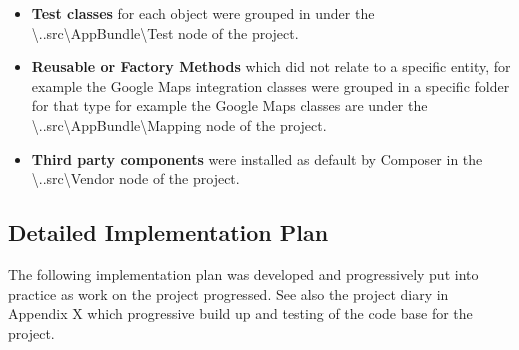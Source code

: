 \documentclass[a4paper,Times New Roman 11pt]{article}
\begin{document}
\begin {itemize}
\textbackslash ..src\textbackslash AppBundle\textbackslash Repository node of the project. Within this folder a separate controller file was created with a standard naming convention used e.g. EmployeeRepository, RosterRepository. 

\item \textbf{Test classes} for each object were grouped in under the 
\textbackslash..src\textbackslash AppBundle\textbackslash Test node of the project.  

\item \textbf{Reusable or Factory Methods} which did not relate to a specific entity, for example the Google Maps integration classes were grouped in a specific folder for that type for example the Google Maps classes are under the 
\textbackslash..src\textbackslash AppBundle\textbackslash Mapping node of the project.  

\item \textbf{Third party components} were installed as default by Composer in the 
\textbackslash ..src\textbackslash Vendor node of the project.  
\end {itemize}

\subsection {Detailed  Implementation Plan}

The following implementation plan was developed and progressively put into practice as work on the project progressed. See also the project diary in Appendix X which progressive build up and testing of the code base for the project.
\end{document}
